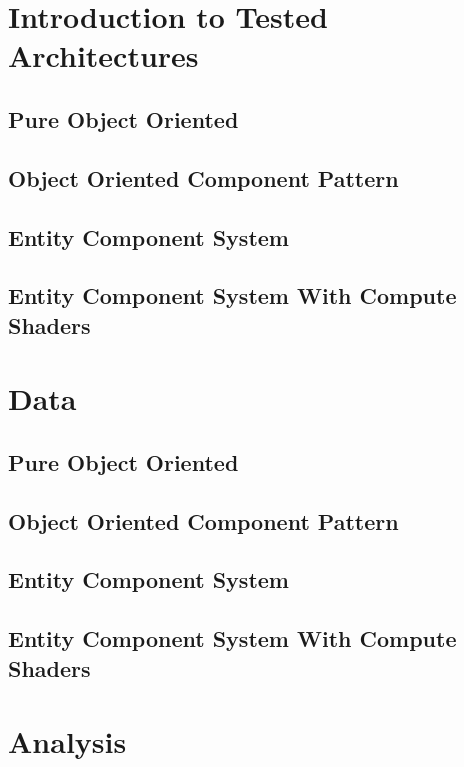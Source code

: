 \documentclass{article}
\begin{document}
\section{Introduction to Tested Architectures}
\subsection{Pure Object Oriented}

\subsection{Object Oriented Component Pattern}

\subsection{Entity Component System}

\subsection{Entity Component System With Compute Shaders}

\section{Data}
\subsection{Pure Object Oriented}

\subsection{Object Oriented Component Pattern}

\subsection{Entity Component System}

\subsection{Entity Component System With Compute Shaders}

\section{Analysis}
\end{document}
